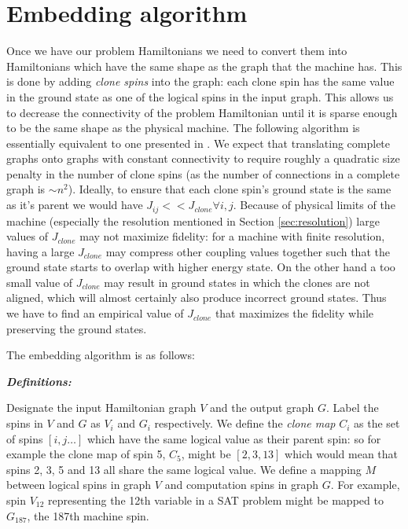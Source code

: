 \section{Embedding algorithm}
\label{sec:embed_algo}
Once we have our problem Hamiltonians we need to convert them into Hamiltonians which have the same shape as the graph that the \machine machine has.  This is done by adding \emph{clone spins} into the graph: each clone spin has the same value in the ground state as one of the logical spins in the input graph.  
This allows us to decrease the connectivity of the problem Hamiltonian until it is sparse enough to be the same shape as the physical machine.  The following algorithm is essentially equivalent to one presented in \cite{choi1}.
We expect that translating complete graphs onto graphs with constant connectivity to require roughly a quadratic size penalty in the number of clone spins (as the number of connections in a complete graph is $\sim n^2$).
Ideally, to ensure that each clone spin's ground state is the same as it's parent we would have $J_{ij} << J_{clone} \forall i,j$.  Because of physical limits of the machine (especially the resolution mentioned in Section \ref{sec:resolution}) large values of $J_{clone}$ may not maximize fidelity: for a machine with finite resolution, having a large $J_{clone}$ may compress other coupling values together such that the ground state starts to overlap with higher energy state.  On the other hand a too small value of $J_{clone}$ may result in ground states in which the clones are not aligned, which will almost certainly also produce incorrect ground states. Thus we have to find an empirical value of $J_{clone}$ that maximizes the fidelity while preserving the ground states.

The embedding algorithm is as follows:

\emph{\textbf{Definitions:}}

Designate the input Hamiltonian graph $V$ and the output graph $G$.  Label the spins in $V$ and $G$ as $V_i$ and $G_i$ respectively.
We define the \emph{clone map} $C_i$ as the set of spins $[i,j \ldots]$ which have the same logical value as their parent spin: so for example the clone map of spin 5, $C_5$, might be $[2,3,13]$ which would mean that spins 2, 3, 5 and 13 all share the same logical value.  
We define a mapping $M$ between logical spins in graph $V$ and computation spins in graph $G$.  For example, spin $V_{12}$ representing the 12th variable in a SAT problem might be mapped to $G_{187}$, the 187th machine spin.

